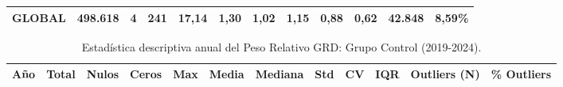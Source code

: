 \begin{table}[htbp]
\begin{tabular}{|c|c|c|c|c|c|c|c|c|c|c|c|}
\parbox[t]{1cm}{\centering\textbf{GLOBAL}} & \parbox[t]{1.3cm}{\raggedleft\textbf{498.618}} & \parbox[t]{1.0cm}{\raggedleft\textbf{4}} & \parbox[t]{1.0cm}{\raggedleft\textbf{241}} & \parbox[t]{1.1cm}{\raggedleft\textbf{17,14}} & \parbox[t]{1.0cm}{\raggedleft\textbf{1,30}} & \parbox[t]{1.2cm}{\raggedleft\textbf{1,02}} & \parbox[t]{1.0cm}{\raggedleft\textbf{1,15}} & \parbox[t]{1.0cm}{\raggedleft\textbf{0,88}} & \parbox[t]{1.0cm}{\raggedleft\textbf{0,62}} & \parbox[t]{1.5cm}{\raggedleft\textbf{42.848}} & \parbox[t]{1.5cm}{\raggedleft\textbf{8,59\%}} \\ \hline
\end{tabular}
\end{table}

\begin{table}[htbp]
\centering
\scriptsize
\setlength{\tabcolsep}{2pt}
\renewcommand{\arraystretch}{1.2}
\caption{Estadística descriptiva anual del Peso Relativo GRD: Grupo Control (2019-2024).}
\label{tab:estadisticas_peso_control}
\begin{tabular}{|c|c|c|c|c|c|c|c|c|c|c|c|}
\hline
\parbox[t]{1cm}{\centering\textbf{Año}} & 
\parbox[t]{1.3cm}{\centering\textbf{Total}} & 
\parbox[t]{1.0cm}{\centering\textbf{Nulos}} & 
\parbox[t]{1.0cm}{\centering\textbf{Ceros}} & 
\parbox[t]{1.1cm}{\centering\textbf{Max}} & 
\parbox[t]{1.0cm}{\centering\textbf{Media}} & 
\parbox[t]{1.2cm}{\centering\textbf{Mediana}} & 
\parbox[t]{1.0cm}{\centering\textbf{Std}} & 
\parbox[t]{1.0cm}{\centering\textbf{CV}} & 
\parbox[t]{1.0cm}{\centering\textbf{IQR}} & 
\parbox[t]{1.5cm}{\centering\textbf{Outliers (N)}} & 
\parbox[t]{1.5cm}{\centering\textbf{\% Outliers}} \\ \hline


\end{tabular}
\end{table}
